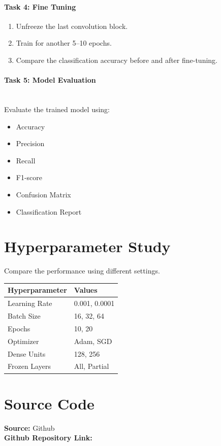 \documentclass[11pt]{article}
\begin{document}
\paragraph{Task 4: Fine Tuning}
\begin{enumerate}
    \item Unfreeze the last convolution block.
    \item Train for another 5–10 epochs.
    \item Compare the classification accuracy before and after fine-tuning.
\end{enumerate}

\paragraph{Task 5: Model Evaluation}\hfill\\
Evaluate the trained model using:
\begin{itemize}
    \item Accuracy
    \item Precision
    \item Recall
    \item F1-score
    \item Confusion Matrix
    \item Classification Report
\end{itemize}

\section{Hyperparameter Study}
Compare the performance using different settings.

\begin{table}[H]
\centering
\begin{tabular}{|l|l|}
\hline
\textbf{Hyperparameter} & \textbf{Values} \\ \hline
Learning Rate & 0.001, 0.0001 \\ \hline
Batch Size & 16, 32, 64 \\ \hline
Epochs & 10, 20 \\ \hline
Optimizer & Adam, SGD \\ \hline
Dense Units & 128, 256 \\ \hline
Frozen Layers & All, Partial \\ \hline
\end{tabular}
\end{table}

\section{Source Code}
\noindent\textbf{Source:} Github\\
\noindent\textbf{Github Repository Link:}
\end{document}
